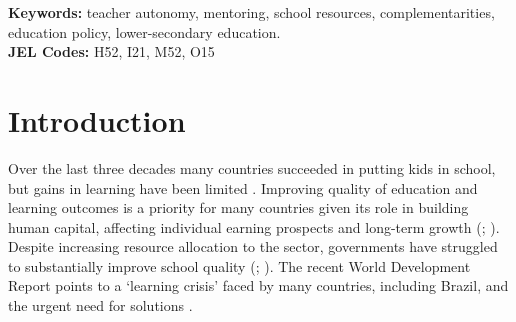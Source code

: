 \documentclass[11pt,a4paper]{article}
\begin{document}
	
	\vspace{1.5em}
	\begin{flushleft}
		\textbf{Keywords:}  teacher autonomy, mentoring, school resources, complementarities, education policy, lower-secondary education.  \\[1em]
		\textbf{JEL Codes:} H52, I21, M52, O15 \\
	\end{flushleft}
	
	\newpage
	\sloppy
	
	\doublespacing
	
	\setlength\parskip{1em}
	\setlength\parindent{0pt}
	
	
	
	\section{Introduction} \label{intro}
	
	
	Over the last three decades many countries succeeded in putting kids in school, but gains in learning have been limited \citep{WDR2018}. Improving quality of education and learning outcomes is a priority for many countries given its role in building human capital, affecting individual earning prospects and long-term growth (\citealp{hanushek2008role, hanushek2012better}; \citealp{chetty2014measuringII}). Despite increasing resource allocation to the sector, governments have struggled to substantially improve school quality (\citealp{mcewan2015improving}; \citealp{WDR2018}). The recent World Development Report points to a `learning crisis' faced by many countries, including Brazil, and the urgent need for solutions \citep{WDR2018}. 
	
\end{document}
